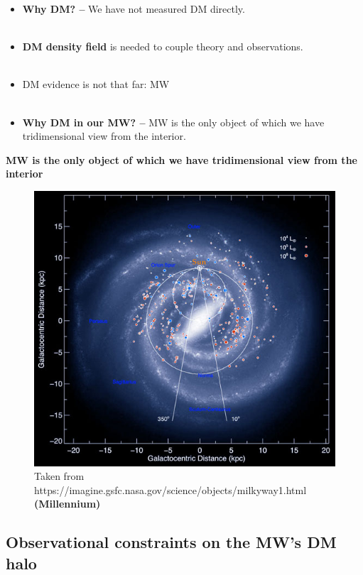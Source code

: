 \documentclass[xcolor=dvipsnames]{beamer}
\begin{document}
\begin{frame}
\large
\begin{itemize}
\small
\item \textbf{Why DM? --} We have not measured DM directly.\\~\\
\item \textbf{DM density field} is needed to couple theory and observations.\\~\\
\item DM evidence is not that far: MW\\~\\
\item \textbf{Why DM in our MW? -- }MW is the only object of which we have tridimensional view from the interior.
\end{itemize}
\normalsize
\end{frame}

\begin{frame}
\centering
\large
\textbf{MW is the only object of which we have tridimensional view from the interior}

\begin{figure}
\includegraphics[width=0.55\linewidth]{./pics/MW.jpg}
\caption{\tiny Taken from https://imagine.gsfc.nasa.gov/science/objects/milkyway1.html \textbf{(Millennium)}}
\end{figure}
\end{frame}

\subsection{Observational constraints on the MW's DM halo}
\end{document}

